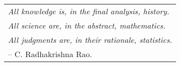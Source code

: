 
\vspace*{0.3\textheight}

\begin{center}\large
\begin{tabular}{l}
\textit{All knowledge is, in the final analysis, history.} \\
\textit{All science are, in the abstract, mathematics. }\\
\textit{All judgments are, in their rationale, statistics.}\\
\hspace{4.5cm} -- C. Radhakrishna Rao.
\end{tabular}
\end{center}

\normalfont
